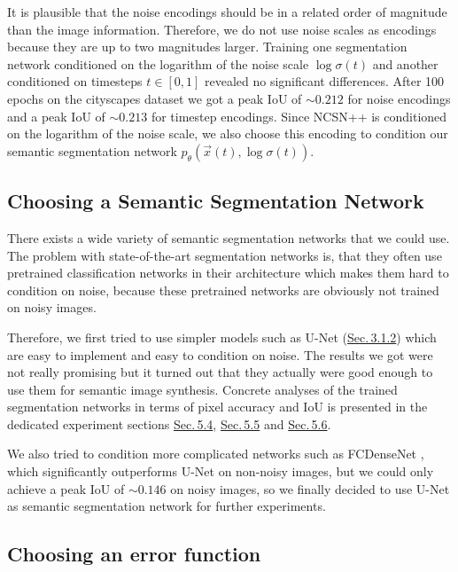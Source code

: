 It is plausible that the noise encodings should be in a related order of magnitude than the image information. Therefore, we do not use noise scales as encodings because they are up to two magnitudes larger. Training one segmentation network conditioned on the logarithm of the noise scale $\log \sigma(t)$ and another conditioned on timesteps $t\in[0,1]$ revealed no significant differences. After 100 epochs on the cityscapes dataset we got a peak IoU of $\sim0.212$ for noise encodings and a peak IoU of $\sim0.213$ for timestep encodings. Since NCSN++ is conditioned on the logarithm of the noise scale, we also choose this encoding to condition our semantic segmentation network $p_\theta(\vec{x}(t), \log \sigma(t))$.

\subsection{Choosing a Semantic Segmentation Network}

There exists a wide variety of semantic segmentation networks that we could use. The problem with state-of-the-art segmentation networks is, that they often use pretrained classification networks in their architecture which makes them hard to condition on noise, because these pretrained networks are obviously not trained on noisy images. 

Therefore, we first tried to use simpler models such as U-Net (\hyperref[sec:3.1.2]{Sec.\,3.1.2}) which are easy to implement and easy to condition on noise. The results we got were not really promising but it turned out that they actually were good enough to use them for semantic image synthesis. Concrete analyses of the trained segmentation networks in terms of pixel accuracy and IoU is presented in the dedicated experiment sections \hyperref[sec:5.4]{Sec.\,5.4}, \hyperref[sec:5.5]{Sec.\,5.5} and \hyperref[sec:5.6]{Sec.\,5.6}.

We also tried to condition more complicated networks such as FCDenseNet \cite{densenet}, which significantly outperforms U-Net on non-noisy images, but we could only achieve a peak IoU of $\sim0.146$ on noisy images, so we finally decided to use U-Net as semantic segmentation network for further experiments.

\subsection{Choosing an error function}

